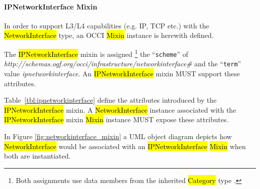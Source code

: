 \documentclass[10pt,a4paper]{article}
\begin{document}
\paragraph{IPNetworkInterface Mixin}
In order to support L3/L4 capabilities (e.g. IP, TCP etc.) with the
\hl{NetworkInterface} type, an OCCI \hl{Mixin} instance is herewith defined.

The \hl{IPNetworkInterface} mixin is assigned%
\footnote{Both assignments use data members from the inherited \hl{Category}
type \cite{occi:core}.}
the ``{\tt scheme}'' of
\textit{http://schemas.ogf.org/occi/infrastructure/networkinterface\#} and the ``{\tt term}'' value 
\textit{ipnetworkinterface}. 
An \hl{IPNetworkInterface} mixin MUST support these attributes.

Table~\ref{tbl:ipnetworkinterface} define the attributes introduced by the
\hl{IPNetworkInterface} mixin.  A \hl{NetworkInterface} instance associated with the
\hl{IPNetworkInterface} mixin \hl{Mixin} instance MUST expose these attributes.


In Figure \ref{fig:networkinterface_mixin} a UML object diagram depicts how \hl{NetworkInterface} 
would be associated with an \hl{IPNetworkInterface} \hl{Mixin} when both are instantiated.
\end{document}
